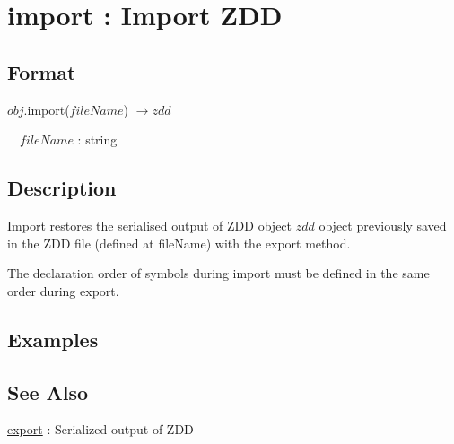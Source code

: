
\section{import : Import ZDD\label{sect:import}}
\subsection*{Format}
$obj$.import($fileName$) $\rightarrow zdd$

~~$fileName$ : string

\subsection*{Description}
Import restores the serialised output of ZDD object $zdd$ object previously saved in the ZDD file (defined at fileName) with the export method. 
 
The declaration order of symbols during import must be defined in the same order during export. 


\subsection*{Examples}


\subsection*{See Also}
\hyperref[sect:export]{export} : Serialized output of ZDD

